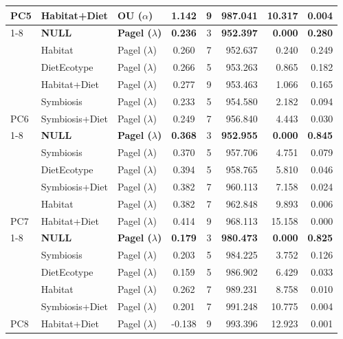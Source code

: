 \begin{table}[!h]
\begin{tabular}[t]{lllccrrr}
\multirow{-6}{*}{\raggedright\arraybackslash PC5} & Habitat+Diet & OU ($\alpha$) & 1.142 & 9 & 987.041 & 10.317 & 0.004\\
\cmidrule{1-8}
 & \textbf{NULL} & \textbf{Pagel ($\lambda$)} & \textbf{0.236} & 3 & \textbf{952.397} & \textbf{0.000} & \textbf{0.280}\\

 & Habitat & Pagel ($\lambda$) & 0.260 & 7 & 952.637 & 0.240 & 0.249\\

 & DietEcotype & Pagel ($\lambda$) & 0.266 & 5 & 953.263 & 0.865 & 0.182\\

 & Habitat+Diet & Pagel ($\lambda$) & 0.277 & 9 & 953.463 & 1.066 & 0.165\\

 & Symbiosis & Pagel ($\lambda$) & 0.233 & 5 & 954.580 & 2.182 & 0.094\\

\multirow{-6}{*}{\raggedright\arraybackslash PC6} & Symbiosis+Diet & Pagel ($\lambda$) & 0.249 & 7 & 956.840 & 4.443 & 0.030\\
\cmidrule{1-8}
 & \textbf{NULL} & \textbf{Pagel ($\lambda$)} & \textbf{0.368} & 3 & \textbf{952.955} & \textbf{0.000} & \textbf{0.845}\\

 & Symbiosis & Pagel ($\lambda$) & 0.370 & 5 & 957.706 & 4.751 & 0.079\\

 & DietEcotype & Pagel ($\lambda$) & 0.394 & 5 & 958.765 & 5.810 & 0.046\\

 & Symbiosis+Diet & Pagel ($\lambda$) & 0.382 & 7 & 960.113 & 7.158 & 0.024\\

 & Habitat & Pagel ($\lambda$) & 0.382 & 7 & 962.848 & 9.893 & 0.006\\

\multirow{-6}{*}{\raggedright\arraybackslash PC7} & Habitat+Diet & Pagel ($\lambda$) & 0.414 & 9 & 968.113 & 15.158 & 0.000\\
\cmidrule{1-8}
 & \textbf{NULL} & \textbf{Pagel ($\lambda$)} & \textbf{0.179} & 3 & \textbf{980.473} & \textbf{0.000} & \textbf{0.825}\\

 & Symbiosis & Pagel ($\lambda$) & 0.203 & 5 & 984.225 & 3.752 & 0.126\\

 & DietEcotype & Pagel ($\lambda$) & 0.159 & 5 & 986.902 & 6.429 & 0.033\\

 & Habitat & Pagel ($\lambda$) & 0.262 & 7 & 989.231 & 8.758 & 0.010\\

 & Symbiosis+Diet & Pagel ($\lambda$) & 0.201 & 7 & 991.248 & 10.775 & 0.004\\

\multirow{-6}{*}{\raggedright\arraybackslash PC8} & Habitat+Diet & Pagel ($\lambda$) & -0.138 & 9 & 993.396 & 12.923 & 0.001\\
\bottomrule
\end{tabular}
\end{table}
